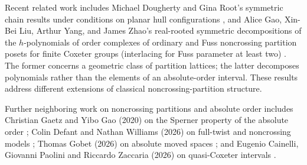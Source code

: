 \documentclass[11pt]{article}
\theoremstyle{definition}
\begin{document}
\begin{appendices}
Recent related work includes Michael Dougherty and Gina Root's
symmetric chain results under conditions on planar hull configurations
\cite[Theorem~A]{DR}, and Alice Gao, Xin-Bei Liu, Arthur Yang, and James Zhao's
real-rooted symmetric decompositions of the $h$-polynomials of order
complexes of ordinary and Fuss noncrossing partition posets for finite
Coxeter groups (interlacing for Fuss parameter at least two)
\cite[Theorem~1.5]{GLYZ}. The former concerns a geometric class of partition
lattices; the latter decomposes polynomials rather than the elements
of an absolute-order interval. These results address different
extensions of classical noncrossing-partition structure.

Further neighboring work on noncrossing partitions and absolute order
includes Christian Gaetz and Yibo Gao (2020)
on the Sperner property of the absolute order \cite{GG2020}; Colin Defant
and Nathan Williams (2026) on full-twist and noncrossing models
\cite{DW2026}; Thomas Gobet (2026) on absolute moved spaces
\cite{Gobet2026}; and Eugenio Cainelli, Giovanni Paolini and Riccardo
Zaccaria (2026) on quasi-Coxeter intervals \cite{CPZ2026}.
\end{appendices}
\end{document}
